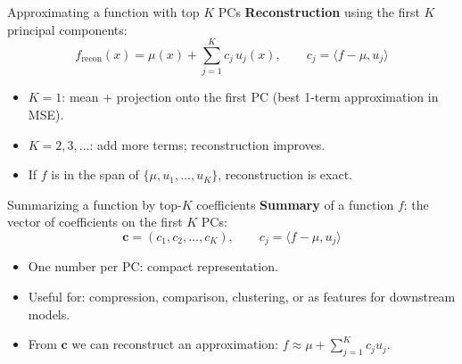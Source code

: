 \documentclass[aspectratio=169]{beamer}
\begin{document}
\begin{frame}{Approximating a function with top $K$ PCs}
  \small
  \textbf{Reconstruction} using the first $K$ principal components:
  \[
  f_{\text{recon}}(x) = \mu(x) + \sum_{j=1}^K c_j\, u_j(x), \qquad c_j = \langle f - \mu, u_j \rangle
  \]
  \vspace{0.2cm}
  \begin{itemize}
    \item $K=1$: mean + projection onto the first PC (best 1-term approximation in MSE).
    \item $K=2,3,\ldots$: add more terms; reconstruction improves.
    \item If $f$ is in the span of $\{\mu, u_1, \ldots, u_K\}$, reconstruction is exact.
  \end{itemize}
\end{frame}

\begin{frame}{Summarizing a function by top-$K$ coefficients}
  \small
  \textbf{Summary} of a function $f$: the vector of coefficients on the first $K$ PCs:
  \[
  \mathbf{c} = (c_1, c_2, \ldots, c_K), \qquad c_j = \langle f - \mu, u_j \rangle
  \]
  \vspace{0.2cm}
  \begin{itemize}
    \item One number per PC: compact representation.
    \item Useful for: compression, comparison, clustering, or as features for downstream models.
    \item From $\mathbf{c}$ we can reconstruct an approximation: $f \approx \mu + \sum_{j=1}^K c_j u_j$.
  \end{itemize}
\end{frame}
\end{document}
